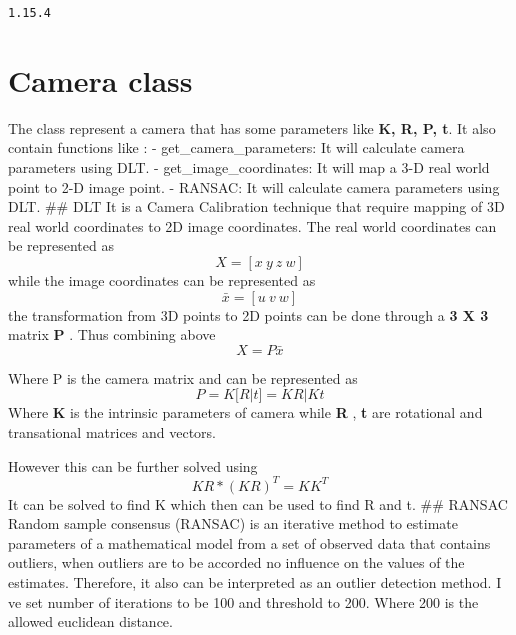 \documentclass[11pt]{article}
\begin{document}
    \begin{Verbatim}[commandchars=\\\{\}]
1.15.4

    \end{Verbatim}

    \hypertarget{camera-class}{%
\section{Camera class}\label{camera-class}}

The class represent a camera that has some parameters like \textbf{K, R,
P, t}. It also contain functions like : - get\_camera\_parameters: It
will calculate camera parameters using DLT. - get\_image\_coordinates:
It will map a 3-D real world point to 2-D image point. - RANSAC: It will
calculate camera parameters using DLT. \#\# DLT It is a Camera
Calibration technique that require mapping of 3D real world coordinates
to 2D image coordinates. The real world coordinates can be represented
as\begin{equation*}
X = [x\ y\ z\ w]
\end{equation*} while the image coordinates can be represented as
\begin{equation*}
\bar{x} = [u\ v\ w]
\end{equation*} the transformation from 3D points to 2D points can be
done through a \textbf{3 X 3} matrix \textbf{P} . Thus combining above
\begin{equation}\label{eq:}
X = P\bar{x}
\end{equation}

Where P is the camera matrix and can be represented as\begin{equation*}
P = K[R|t] = KR|Kt
\end{equation*} Where \textbf{K} is the intrinsic parameters of camera
while \textbf{R} , \textbf{t} are rotational and transational matrices
and vectors.

However this can be further solved using\begin{equation*}
KR*(KR)^T = KK^T
\end{equation*} It can be solved to find K which then can be used to
find R and t. \#\# RANSAC Random sample consensus (RANSAC) is an
iterative method to estimate parameters of a mathematical model from a
set of observed data that contains outliers, when outliers are to be
accorded no influence on the values of the estimates. Therefore, it also
can be interpreted as an outlier detection method. I ve set number of
iterations to be 100 and threshold to 200. Where 200 is the allowed
euclidean distance.
\end{document}
